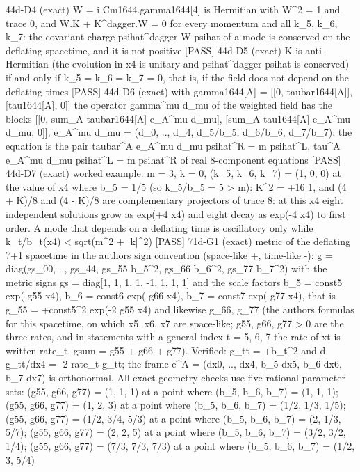 \documentclass[
  10pt,
]{article}
\newenvironment{Shaded}{}{}
\newcommand{\NormalTok}[1]{#1}
\begin{document}
\begin{Shaded}
\begin{Highlighting}[]
\NormalTok{[PASS] 44d{-}D4  (exact) W = i Cm1644.gamma1644[4] is Hermitian with W\^{}2 = 1 and trace 0, and W.K + K\^{}dagger.W = 0 for every momentum and all k\_5, k\_6, k\_7: the covariant charge psihat\^{}dagger W psihat of a mode is conserved on the deflating spacetime, and it is not positive}
\NormalTok{[PASS] 44d{-}D5  (exact) K is anti{-}Hermitian (the evolution in x4 is unitary and psihat\^{}dagger psihat is conserved) if and only if k\_5 = k\_6 = k\_7 = 0, that is, if the field does not depend on the deflating times}
\NormalTok{[PASS] 44d{-}D6  (exact) with gamma1644[A] = [[0, taubar1644[A]], [tau1644[A], 0]] the operator gamma\^{}mu d\_mu of the weighted field has the blocks [[0, sum\_A taubar1644[A] e\_A\^{}mu d\_mu], [sum\_A tau1644[A] e\_A\^{}mu d\_mu, 0]], e\_A\^{}mu d\_mu = (d\_0, .., d\_4, d\_5/b\_5, d\_6/b\_6, d\_7/b\_7): the equation is the pair taubar\^{}A e\_A\^{}mu d\_mu psihat\^{}R = m psihat\^{}L, tau\^{}A e\_A\^{}mu d\_mu psihat\^{}L = m psihat\^{}R of real 8{-}component equations}
\NormalTok{[PASS] 44d{-}D7  (exact) worked example: m = 3, k = 0, (k\_5, k\_6, k\_7) = (1, 0, 0) at the value of x4 where b\_5 = 1/5 (so k\_5/b\_5 = 5 \textgreater{} m): K\^{}2 = +16 1, and (4 + K)/8 and (4 {-} K)/8 are complementary projectors of trace 8: at this x4 eight independent solutions grow as exp(+4 x4) and eight decay as exp({-}4 x4) to first order. A mode that depends on a deflating time is oscillatory only while k\_t/b\_t(x4) \textless{} sqrt(m\^{}2 + |k|\^{}2)}
\NormalTok{[PASS] 71d{-}G1  (exact) metric of the deflating 7+1 spacetime in the author\textquotesingle{}s sign convention (space{-}like +, time{-}like {-}): g = diag(gs\_00, .., gs\_44, gs\_55 b\_5\^{}2, gs\_66 b\_6\^{}2, gs\_77 b\_7\^{}2) with the metric signs gs = diag[1, 1, 1, 1, {-}1, 1, 1, 1] and the scale factors b\_5 = const5 exp({-}g55 x4), b\_6 = const6 exp({-}g66 x4), b\_7 = const7 exp({-}g77 x4), that is g\_55 = +const5\^{}2 exp({-}2 g55 x4) and likewise g\_66, g\_77 (the author\textquotesingle{}s formulas for this spacetime, on which x5, x6, x7 are space{-}like; g55, g66, g77 \textgreater{} 0 are the three rates, and in statements with a general index t = 5, 6, 7 the rate of xt is written rate\_t, gsum = g55 + g66 + g77). Verified: g\_tt = +b\_t\^{}2 and d g\_tt/dx4 = {-}2 rate\_t g\_tt; the frame e\^{}A = (dx0, .., dx4, b\_5 dx5, b\_6 dx6, b\_7 dx7) is orthonormal. All exact geometry checks use five rational parameter sets: (g55, g66, g77) = (1, 1, 1) at a point where (b\_5, b\_6, b\_7) = (1, 1, 1); (g55, g66, g77) = (1, 2, 3) at a point where (b\_5, b\_6, b\_7) = (1/2, 1/3, 1/5); (g55, g66, g77) = (1/2, 3/4, 5/3) at a point where (b\_5, b\_6, b\_7) = (2, 1/3, 5/7); (g55, g66, g77) = (2, 2, 5) at a point where (b\_5, b\_6, b\_7) = (3/2, 3/2, 1/4); (g55, g66, g77) = (7/3, 7/3, 7/3) at a point where (b\_5, b\_6, b\_7) = (1/2, 3, 5/4)}

\end{Highlighting}
\end{Shaded}
\end{document}
